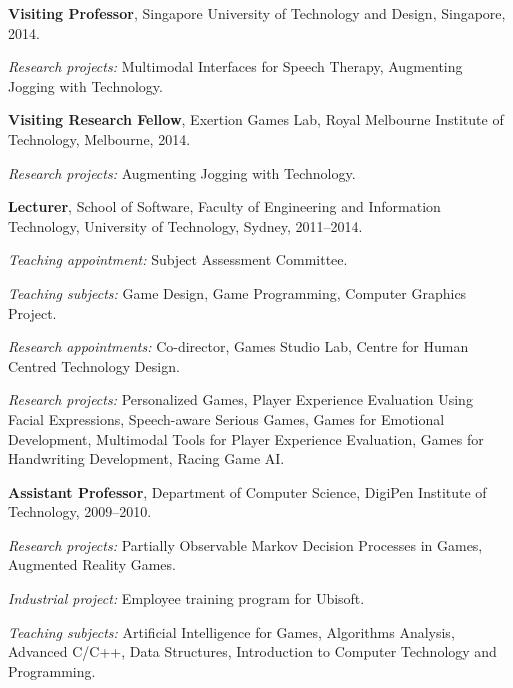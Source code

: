 \documentclass[10pt,a4paper]{article}
\renewenvironment{itemize}{
  \begin{list}{}{
    \setlength{\leftmargin}{1.5em}
    \setlength{\itemsep}{0.25em}
    \setlength{\parskip}{0pt}
    \setlength{\parsep}{0.25em}
  }
}{
  \end{list}
}
\begin{document}
\begin{itemize}
\item \textbf{Visiting Professor}, Singapore University of Technology and Design, Singapore,
	2014.
    \begin{itemize}
        \item \textit{Research projects:} Multimodal Interfaces for Speech Therapy, Augmenting Jogging with Technology.
    \end{itemize}

\item \textbf{Visiting Research Fellow}, Exertion Games Lab, Royal Melbourne Institute of Technology, Melbourne,
	2014.
    \begin{itemize}
        \item \textit{Research projects:} Augmenting Jogging with Technology.
    \end{itemize}

\item \textbf{Lecturer}, School of Software, Faculty of Engineering and Information Technology, University of Technology, Sydney,
    2011--2014.
    \begin{itemize}
        \item \textit{Teaching appointment:} Subject Assessment Committee.
        \item \textit{Teaching subjects:} Game Design, Game Programming, Computer Graphics Project.
        \item \textit{Research appointments:} Co-director, Games Studio Lab, Centre for Human Centred Technology Design.
        \item \textit{Research projects:} Personalized Games, Player Experience Evaluation Using Facial Expressions, Speech-aware Serious Games, Games for Emotional Development, Multimodal Tools for Player Experience Evaluation, Games for Handwriting Development, Racing Game AI.
    \end{itemize}

\item \textbf{Assistant Professor}, Department of Computer Science, DigiPen Institute of Technology,
    2009--2010.
    \begin{itemize}
        \item \textit{Research projects:} Partially Observable Markov Decision Processes in Games, Augmented Reality Games.
        \item \textit{Industrial project:} Employee training program for Ubisoft.
        \item \textit{Teaching subjects:} Artificial Intelligence for Games, Algorithms Analysis, Advanced C/C++, Data Structures, Introduction to Computer Technology and Programming.
    \end{itemize}


\end{itemize}
\end{document}

